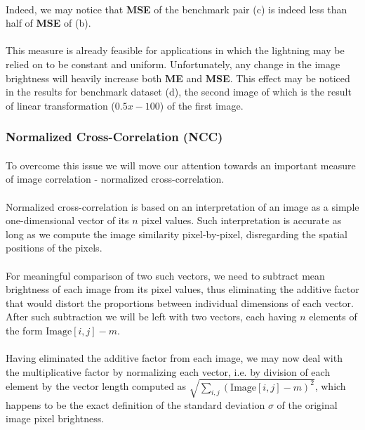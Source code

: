 \paragraph*{}
Indeed, we may notice that \textbf{MSE} of the benchmark pair (c) is indeed less than half of \textbf{MSE} of (b).

\paragraph*{}
This measure is already feasible for applications in which the lightning may be relied on to be constant and uniform. Unfortunately, any change in the image brightness will heavily increase both \textbf{ME} and \textbf{MSE}. This effect may be noticed in the results for benchmark dataset (d), the second image of which is the result of linear transformation ($0.5x - 100$) of the first image.

\subsubsection{Normalized Cross-Correlation (NCC)}

\paragraph*{}
To overcome this issue we will move our attention towards an important measure of image correlation - normalized cross-correlation. 

\paragraph*{}
Normalized cross-correlation is based on an interpretation of an image as a simple one-dimensional vector of its $n$ pixel values. Such interpretation is accurate as long as we compute the image similarity pixel-by-pixel, disregarding the spatial positions of the pixels.

\paragraph*{}
For meaningful comparison of two such vectors, we need to subtract mean brightness of each image from its pixel values, thus eliminating the additive factor that would distort the proportions between individual dimensions of each vector. After such subtraction we will be left with two vectors, each having $n$ elements of the form $\mbox{Image}[i,j] - m$.

\paragraph*{}
Having eliminated the additive factor from each image, we may now deal with the multiplicative factor by normalizing each vector, i.e. by division of each element by the vector length computed as $\sqrt{\sum_{i,j} (\mbox{Image}[i,j] - m)^2}$, which happens to be the exact definition of the standard deviation $\sigma$ of the original image pixel brightness.

